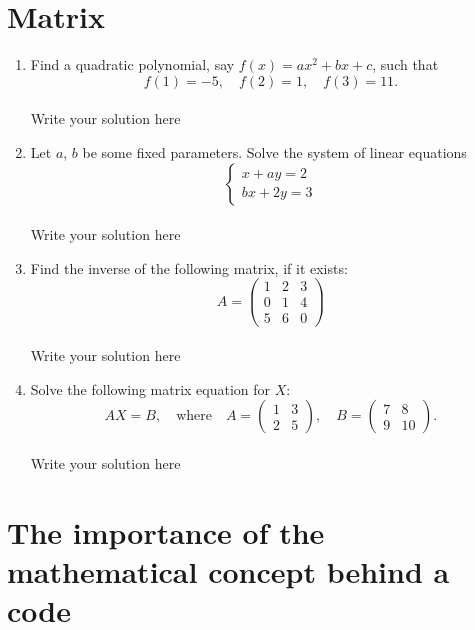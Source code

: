 \documentclass[a4paper]{article}
\begin{document}
% 
% 
\section{Matrix}

\begin{enumerate}
	\item Find a quadratic polynomial, say $f(x) = ax^2 + bx + c$, such that
	      \[
		      f(1) = -5, \quad f(2) = 1, \quad f(3) = 11.
	      \]
	      \hrulefill\\
	      Write your solution here


	\item Let $a$, $b$ be some fixed parameters. Solve the system of linear equations
	      \[
		      \begin{cases*}
			      x + ay = 2 \\
			      bx + 2y = 3
		      \end{cases*}
	      \]
	      \hrulefill\\
	      Write your solution here

	\item Find the inverse of the following matrix, if it exists:
	      $$
		      A = \begin{pmatrix}
			      1 & 2 & 3 \\
			      0 & 1 & 4 \\
			      5 & 6 & 0
		      \end{pmatrix}
	      $$
	      \hrulefill\\
	      Write your solution here

	\item Solve the following matrix equation for \( X \):
	      $$
		      AX = B, \quad \text{where} \quad A = \begin{pmatrix} 1 & 3 \\ 2 & 5 \end{pmatrix}, \quad B = \begin{pmatrix} 7 & 8 \\ 9 & 10 \end{pmatrix}.
	      $$
	      \hrulefill\\
	      Write your solution here

\end{enumerate}

% 
% 
\clearpage
\section{The importance of the mathematical concept behind a code}
\end{document}
